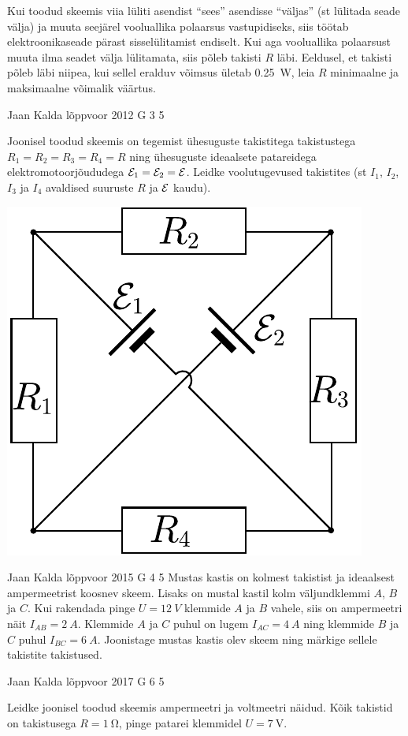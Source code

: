 \documentclass[11pt, twoside]{article}
\begin{document}
{{Kui toodud skeemis viia lüliti asendist \enquote{sees} asendisse \enquote{väljas} (st lülitada seade välja) ja muuta seejärel vooluallika polaarsus vastupidiseks, siis töötab elektroonikaseade pärast sisselülitamist endiselt. Kui aga vooluallika polaarsust muuta ilma seadet välja lülitamata, siis põleb takisti $R$ läbi. Eeldusel, et takisti põleb läbi niipea, kui sellel eralduv võimsus ületab \SI{0.25}{\watt}, leia $R$ minimaalne ja maksimaalne võimalik väärtus.
\fi
}

{Jaan Kalda} %
{lõppvoor} %
{2012} %
{G 3} %
{5} %
{
\ifStatement
Joonisel toodud skeemis on tegemist ühesuguste takistitega takistustega $R_1 = R_2 = R_3 = R_4 = R$ ning ühesuguste
ideaalsete patareidega elektromotoorjõududega ${\cal E}_1 = {\cal E}_2
= {\cal E}$. Leidke voolutugevused takistites (st $I_1$, $I_2$, $I_3$ ja
$I_4$ avaldised suuruste $R$ ja ${\cal E}$ kaudu).

\begin{center}
\includegraphics[width=0.35\linewidth]{2012-v3g-03-elektriline_sild}%
\end{center}
\fi
}

{Jaan Kalda} %
{lõppvoor} %
{2015} %
{G 4} %
{5} %
{
\ifStatement
Mustas kastis on kolmest takistist ja ideaalsest ampermeetrist koosnev skeem. Lisaks on mustal kastil kolm väljundklemmi $A$, $B$ ja $C$. Kui rakendada pinge $U=\SI{12}{V}$ klemmide $A$ ja $B$ vahele, siis on ampermeetri näit $I_{AB}=\SI{2}{A}$. Klemmide $A$ ja $C$ puhul on lugem $I_{AC}=\SI{4}{A}$ ning klemmide $B$ ja $C$ puhul $I_{BC}=\SI{6}{A}$. Joonistage mustas kastis olev skeem ning märkige sellele takistite takistused.
\fi
}

{Jaan Kalda} %
{lõppvoor} %
{2017} %
{G 6} %
{5} %
{
\ifStatement
Leidke joonisel toodud skeemis ampermeetri ja voltmeetri näidud. Kõik takistid on takistusega $R=\SI{1}{\ohm}$, pinge patarei klemmidel $U=\SI{7}{\volt}$.

}}
\end{document}
